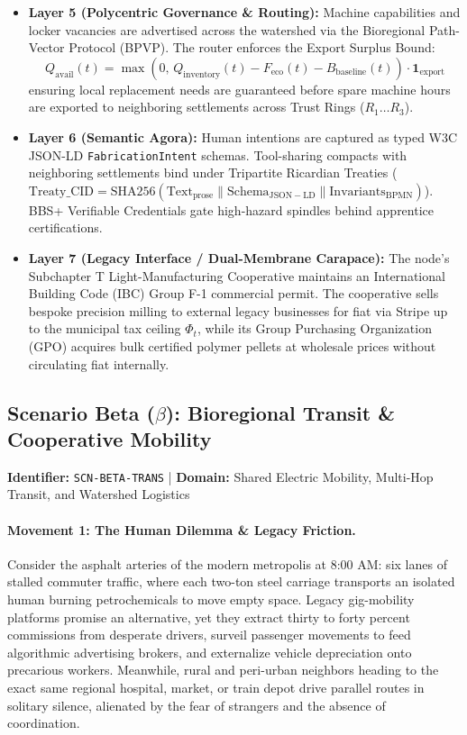 \begin{itemize}
    \item \textbf{Layer 5 (Polycentric Governance \& Routing):} Machine capabilities and locker vacancies are advertised across the watershed via the Bioregional Path-Vector Protocol (BPVP). The router enforces the Export Surplus Bound:
    \[
    Q_{\mathrm{avail}}(t) = \max\left(0, \, Q_{\mathrm{inventory}}(t) - F_{\mathrm{eco}}(t) - B_{\mathrm{baseline}}(t)\right) \cdot \mathbf{1}_{\mathrm{export}}
    \]
    ensuring local replacement needs are guaranteed before spare machine hours are exported to neighboring settlements across Trust Rings ($R_1 \dots R_3$).
    \item \textbf{Layer 6 (Semantic Agora):} Human intentions are captured as typed W3C JSON-LD \texttt{FabricationIntent} schemas. Tool-sharing compacts with neighboring settlements bind under Tripartite Ricardian Treaties ($\mathrm{Treaty\_CID} = \mathrm{SHA256}(\mathrm{Text}_{\mathrm{prose}} \parallel \mathrm{Schema}_{\mathrm{JSON-LD}} \parallel \mathrm{Invariants}_{\mathrm{BPMN}})$). BBS+ Verifiable Credentials gate high-hazard spindles behind apprentice certifications.
    \item \textbf{Layer 7 (Legacy Interface / Dual-Membrane Carapace):} The node's Subchapter T Light-Manufacturing Cooperative maintains an International Building Code (IBC) Group F-1 commercial permit. The cooperative sells bespoke precision milling to external legacy businesses for fiat via Stripe up to the municipal tax ceiling $\Phi_t$, while its Group Purchasing Organization (GPO) acquires bulk certified polymer pellets at wholesale prices without circulating fiat internally.
\end{itemize}

\subsection{Scenario Beta (\texorpdfstring{$\beta$}{Beta}): Bioregional Transit \& Cooperative Mobility}
\label{subsec:scn_beta}
\textbf{Identifier:} \texttt{SCN-BETA-TRANS} \quad | \quad \textbf{Domain:} Shared Electric Mobility, Multi-Hop Transit, and Watershed Logistics

\paragraph{Movement 1: The Human Dilemma \& Legacy Friction.}
Consider the asphalt arteries of the modern metropolis at 8:00 AM: six lanes of stalled commuter traffic, where each two-ton steel carriage transports an isolated human burning petrochemicals to move empty space. Legacy gig-mobility platforms promise an alternative, yet they extract thirty to forty percent commissions from desperate drivers, surveil passenger movements to feed algorithmic advertising brokers, and externalize vehicle depreciation onto precarious workers. Meanwhile, rural and peri-urban neighbors heading to the exact same regional hospital, market, or train depot drive parallel routes in solitary silence, alienated by the fear of strangers and the absence of coordination.

